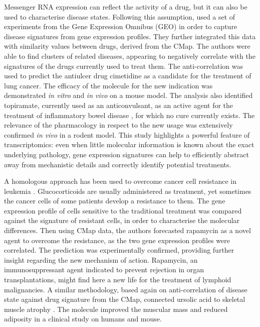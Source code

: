 Messenger RNA expression can reflect the activity of a drug, but it can also be used to characterise disease states. Following this assumption, \citep{sirota2011discovery} used a set of experiments from the Gene Expression Omnibus (GEO) in order to capture disease signatures from gene expression profiles. They further integrated this data with similarity values between drugs, derived from the CMap. The authors were able to find clusters of related diseases, appearing to negatively correlate with the signatures of the drugs currently used to treat them. The anti-correlation was used to predict the antiulcer drug cimetidine as a candidate for the treatment of lung cancer. The efficacy of the molecule for the new indication was demonstrated \emph{in vitro} and \emph{in vivo} on a mouse model. The analysis also identified topiramate, currently used as an anticonvulsant, as an active agent for the treatment of inflammatory bowel disease \citep{dudley2011computational}, for which no cure currently exists. The relevance of the pharmacology in respect to the new usage was extensively confirmed \emph{in vivo} in a rodent model. This study highlights a powerful feature of transcriptomics: even when little molecular information is known about the exact underlying pathology, gene expression signatures can help to efficiently abstract away from mechanistic details and correctly identify potential treatments.

A homologous approach has been used to overcome cancer cell resistance in leukemia \citep{wei2006gene}. Glucocorticoids are usually administered as treatment, yet sometimes the cancer cells of some patients develop a resistance to them. The gene expression profile of cells sensitive to the traditional treatment was compared against the signature of resistant cells, in order to characterise the molecular differences. Then using CMap data, the authors forecasted rapamycin as a novel agent to overcome the resistance, as the two gene expression profiles were correlated. The prediction was experimentally confirmed, providing further insight regarding the new mechanism of action. Rapamycin, an immunosuppressant agent indicated to prevent rejection in organ transplantations, might find here a new life for the treatment of lymphoid malignancies. A similar methodology, based again on anti-correlation of disease state against drug signature from the CMap, connected ursolic acid to skeletal muscle atrophy \citep{kunkel2011mrna}. The molecule improved the muscular mass and reduced adiposity in a clinical study on humans and mouse.

